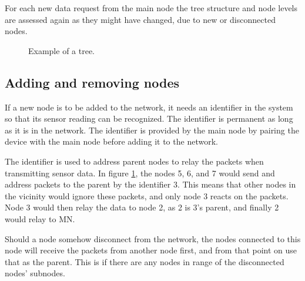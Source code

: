 For each new data request from the main node the tree structure and node levels are assessed again as they might have changed, due to new or disconnected nodes.

\begin{figure}[!h]
	\centering
	\caption{Example of a tree.}
	\label{fig:prottree1}
\end{figure}

\subsection{Adding and removing nodes}
If a new node is to be added to the network, it needs an identifier in the system so that its sensor reading can be recognized. The identifier is permanent as long as it is in the network.
The identifier is provided by the main node by pairing the device with the main node before adding it to the network. 

The identifier is used to address parent nodes to relay the packets when transmitting sensor data. In figure \ref{fig:prottree1}, the nodes 5, 6, and 7 would send and address packets to the parent by the identifier 3. This means that other nodes in the vicinity would ignore these packets, and only node 3 reacts on the packets. Node 3 would then relay the data to node 2, as 2 is 3's parent, and finally 2 would relay to MN.

Should a node somehow disconnect from the network, the nodes connected to this node will receive the packets from another node first, and from that point on use that as the parent. This is if there are any nodes in range of the disconnected nodes' subnodes. 

